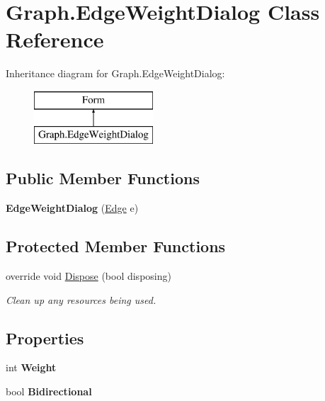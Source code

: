 \hypertarget{class_graph_1_1_edge_weight_dialog}{}\section{Graph.\+Edge\+Weight\+Dialog Class Reference}
\label{class_graph_1_1_edge_weight_dialog}
Inheritance diagram for Graph.\+Edge\+Weight\+Dialog\+:\begin{figure}[H]
\begin{center}
\leavevmode
\includegraphics[height=2.000000cm]{class_graph_1_1_edge_weight_dialog}
\end{center}
\end{figure}
\subsection*{Public Member Functions}
\begin{DoxyCompactItemize}
\item 
\mbox{\label{class_graph_1_1_edge_weight_dialog_a4502237ec4bf0376c452ad108ffe27d0}} 
{\bfseries Edge\+Weight\+Dialog} (\hyperlink{class_graph_1_1_edge}{Edge} e)
\end{DoxyCompactItemize}
\subsection*{Protected Member Functions}
\begin{DoxyCompactItemize}
\item 
override void \hyperlink{class_graph_1_1_edge_weight_dialog_a861196924b6ecb2c9203005c4b73e27c}{Dispose} (bool disposing)
\begin{DoxyCompactList}\small\item\em Clean up any resources being used. \end{DoxyCompactList}\end{DoxyCompactItemize}
\subsection*{Properties}
\begin{DoxyCompactItemize}
\item 
\mbox{\label{class_graph_1_1_edge_weight_dialog_ab7ca80d419f13a2881f8067b36d3d8b8}} 
int {\bfseries Weight}
\item 
\mbox{\label{class_graph_1_1_edge_weight_dialog_ab16d01f448d9533fb43f0a9c0c19f603}} 
bool {\bfseries Bidirectional}
\end{DoxyCompactItemize}



